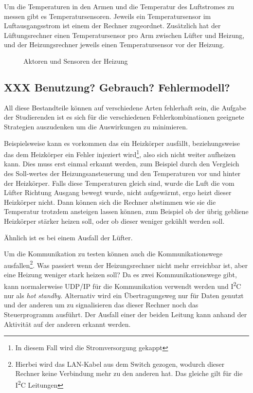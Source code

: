 Um die Temperaturen in den Armen und die Temperatur des Luftstromes zu messen gibt es Temperatursensoren. Jeweils ein Temperatursensor im Luftausgangsstrom ist einem
der Rechner zugeordnet. Zus{\"{a}}tzlich hat der L{\"{u}}ftungsrechner einen Temperatursensor pro Arm zwischen L{\"{u}}fter und Heizung, und der Heizungsrechner jeweils
einen Temperatursensor vor der Heizung.

\begin{figure}
	\centering
	\caption{Aktoren und Sensoren der Heizung}
	\label{fig:heizunghw}
\end{figure}

\subsection{XXX Benutzung? Gebrauch? Fehlermodell?}
All diese Bestandteile k{\"{o}}nnen auf verschiedene Arten fehlerhaft sein, die Aufgabe der Studierenden ist es sich f{\"{u}}r die verschiedenen Fehlerkombinationen
geeignete Strategien auszudenken um die Auswirkungen zu minimieren.

Beispielsweise kann es vorkommen das ein Heizk{\"{o}}rper ausf{\"{a}}llt, beziehungsweise das dem
Heizk{\"{o}}rper ein Fehler injeziert wird\footnote{In diesem Fall wird die Stromversorgung gekappt},
also sich nicht weiter aufheizen kann. Dies muss erst einmal erkannt werden, zum Beispiel
durch den Vergleich des Soll-wertes der Heizungsansteuerung und den Temperaturen vor und hinter der Heizk{\"{o}}rper. Falls diese Temperaturen gleich sind,
wurde die Luft die vom L{\"{u}}fter Richtung Ausgang bewegt wurde, nicht aufgew{\"{a}}rmt, ergo heizt dieser Heizk{\"{o}}rper nicht. Dann k{\"{o}}nnen sich die
Rechner abstimmen wie sie die Temperatur trotzdem ansteigen lassen k{\"{o}}nnen, zum Beispiel ob der {\"{u}}brig gebliene Heizk{\"{o}}rper st{\"{a}}rker heizen
soll, oder ob dieser weniger gek{\"{u}}hlt werden soll.

{\"{A}}hnlich ist es bei einem Ausfall der L{\"{u}}fter. 

Um die Kommunikation zu testen k{\"{o}}nnen auch die Kommunikationswege ausfallen\footnote{Hierbei
wird das LAN-Kabel aus dem Switch gezogen, wodurch dieser Rechner keine Verbindung mehr zu den anderen hat.
Das gleiche gilt f{\"{u}}r die I\textsuperscript{2}C Leitungen}.
Was passiert wenn der Heizungsrechner nicht mehr erreichbar ist, aber eine Heizung weniger stark heizen soll?
Da es zwei Kommunikationswege gibt, kann normalerweise UDP/IP f{\"{u}}r die Kommunikation verwendt werden
und I\textsuperscript{2}C nur als \textit{hot standby}. Alternativ wird ein {\"{U}}bertragungsweg nur
f{\"{u}}r Daten genutzt und der anderen um zu signalisieren das dieser Rechner noch das
Steuerprogramm ausf{\"{u}}hrt. Der Ausfall einer der beiden Leitung kann anhand der Aktivit{\"{a}}t auf der
anderen erkannt werden.

